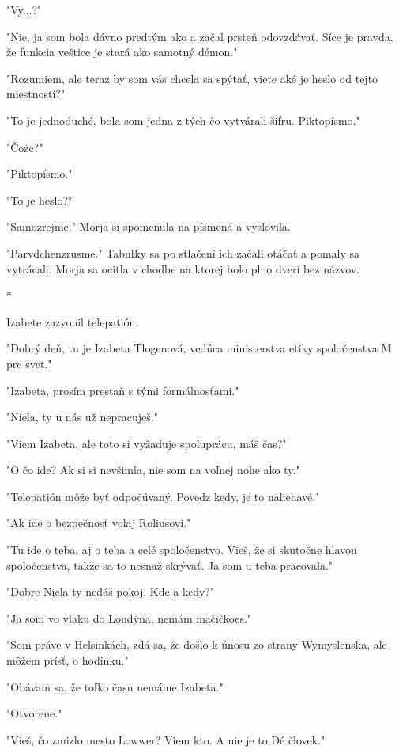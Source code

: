 \documentclass{book}
\begin{document}
"$ $Vy...?"

"$ $Nie, ja som bola dávno predtým ako a začal prsteň odovzdávať. Síce je pravda, že funkcia veštice je stará ako samotný démon."

"$ $Rozumiem, ale teraz by som vás chcela sa spýtať, viete aké je heslo od tejto miestnosti?"

"$ $To je jednoduché, bola som jedna z tých čo vytvárali šifru. Piktopísmo."

"$ $Čože?"

"$ $Piktopísmo."

"$ $To je heslo?"

"$ $Samozrejme."$ $ Morja si spomenula na písmená a vyslovila.

"$ $Parvdchenzrusme."$ $ Tabuľky sa po stlačení ich začali otáčať a pomaly sa vytrácali. Morja sa ocitla v chodbe na ktorej bolo plno dverí bez názvov.

\begin{center}
*
\end{center}

Izabete zazvonil telepatión.

"$ $Dobrý deň, tu je Izabeta Tlogenová, vedúca ministerstva etiky spoločenstva M pre svet."

"$ $Izabeta, prosím prestaň s tými formálnosťami."

"$ $Niela, ty u nás už nepracuješ."

"$ $Viem Izabeta, ale toto si vyžaduje spoluprácu, máš čas?"

"$ $O čo ide? Ak si si nevšimla, nie som na voľnej nohe ako ty."

"$ $Telepatión môže byť odpočúvaný. Povedz kedy, je to naliehavé."

"$ $Ak ide o bezpečnosť volaj Roliusovi."

"$ $Tu ide o teba, aj o teba a celé spoločenstvo. Vieš, že si skutočne hlavou spoločenstva, takže sa to nesnaž skrývať. Ja som u teba pracovala."

"$ $Dobre Niela ty nedáš pokoj. Kde a kedy?"

"$ $Ja som vo vlaku do Londýna, nemám mačičkoes."

"$ $Som práve v Helsinkách, zdá sa, že došlo k únosu zo strany Wymyslenska, ale môžem prísť, o hodinku."

"$ $Obávam sa, že toľko času nemáme Izabeta."

"$ $Otvorene."

"$ $Vieš, čo zmizlo mesto Lowwer? Viem kto. A nie je to Dé človek."
\end{document}
